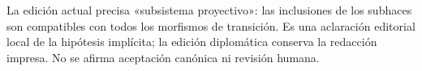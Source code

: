 La edición actual precisa «subsistema proyectivo»: las inclusiones de los subhaces son compatibles con todos los morfismos de transición. Es una aclaración editorial local de la hipótesis implícita; la edición diplomática conserva la redacción impresa. No se afirma aceptación canónica ni revisión humana.
